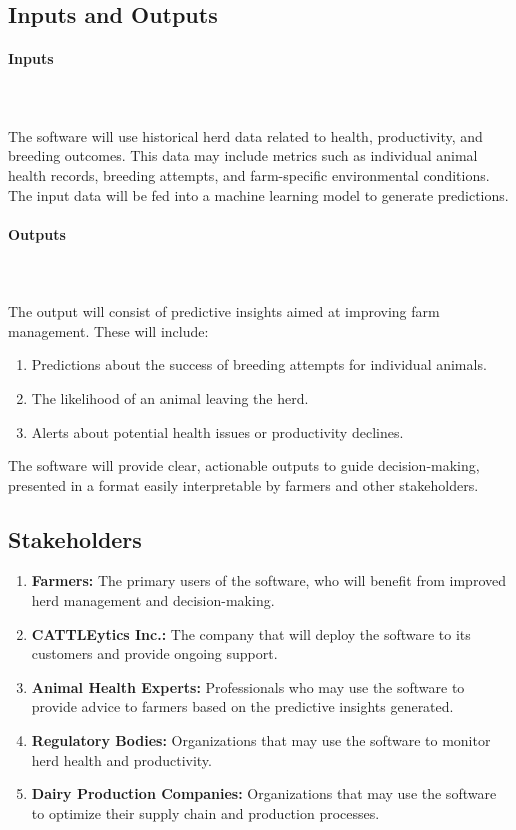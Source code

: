 \documentclass{article}
\begin{document}
\subsection{Inputs and Outputs}

\paragraph{Inputs} \ \\
\\
The software will use historical herd data related to health, productivity, and breeding outcomes. This data may include metrics such as individual animal health records, breeding attempts, and farm-specific environmental conditions. The input data will be fed into a machine learning model to generate predictions.

\paragraph{Outputs} \ \\
\\
The output will consist of predictive insights aimed at improving farm management. These will include:
\begin{enumerate}
    \item Predictions about the success of breeding attempts for individual animals.
    \item The likelihood of an animal leaving the herd.
    \item Alerts about potential health issues or productivity declines.
\end{enumerate}

The software will provide clear, actionable outputs to guide decision-making, presented in a format easily interpretable by farmers and other stakeholders.



\subsection{Stakeholders}

\begin{enumerate}
    \item \textbf{Farmers:} The primary users of the software, who will benefit from improved herd management and decision-making.
    \item \textbf{CATTLEytics Inc.:} The company that will deploy the software to its customers and provide ongoing support.
    \item \textbf{Animal Health Experts:} Professionals who may use the software to provide advice to farmers based on the predictive insights generated.
    \item \textbf{Regulatory Bodies:} Organizations that may use the software to monitor herd health and productivity.
    \item \textbf{Dairy Production Companies:} Organizations that may use the software to optimize their supply chain and production processes.
\end{enumerate}
\end{document}
